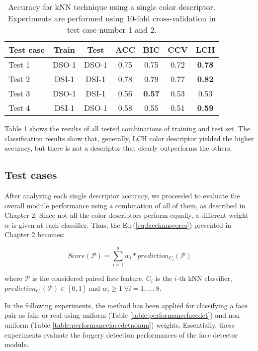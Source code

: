 \begin{table}[h!]
\centering
\begin{tabular}{l c c c c c c} 
\hline \hline 
\textbf{Test case} & \textbf{Train} & \textbf{Test} & \textbf{ACC} & \textbf{BIC} & \textbf{CCV} & \textbf{LCH} \\ [0.5ex]
\hline
Test 1 & DSO-1 & DSO-1 &	0.75 & 0.75	& 0.72 & \textbf{0.78}\\
Test 2 & DSI-1 & DSI-1 &	0.78 & 0.79 & 0.77 & \textbf{0.82}\\
Test 3 &	DSO-1 &	DSI-1 &	0.56 & \textbf{0.57} & 0.53 & 0.53\\
Test 4 &	DSI-1 & DSO-1 & 0.58 & 0.55 & 0.51 & \textbf{0.59}\\ [1ex]
\hline
\end{tabular}
\caption{Accuracy for kNN technique using a single color descriptor. Experiments are performed using 10-fold cross-validation in test case number 1 and 2.}
\label{table:colordescriptorperformance}
\end{table}

Table \ref{table:colordescriptorperformance} shows the results of all tested combinations of training and test set. The classification results show that, generally, LCH color descriptor yielded the higher accuracy, but there is not a descriptor that clearly outperforms the others.

\subsection{Test cases}

After analyzing each single descriptor accuracy, we proceeded to evaluate the overall module performance using a combination of all of them, as described in Chapter 2. Since not all the color descriptors perform equally, a different weight $w$ is given at each classifier. Thus, the Eq.(\ref{eq:faceknnscores}) presented in Chapter 2 becomes:

\begin{equation}
Score(\mathcal{P}) = \sum_{i = 1}^{8} w_i * prediction_{C_i}(\mathcal{P})
\end{equation}

where $\mathcal{P}$ is the considered paired face feature, $C_i$ is the $i$-th kNN classifier, $prediction_{C_i}(\mathcal{P}) \in [0, 1]$ and $w_i \geq 1 \; \forall i = 1, \ldots, 8$.

In the following experiments, the  method has been applied for classifying a face pair as fake or real using uniform (Table \ref{table:performancefacedet}) and non-uniform (Table \ref{table:performancefacedetnonun}) weights. Essentially, these experiments evaluate the forgery detection performances of the face detector module.

